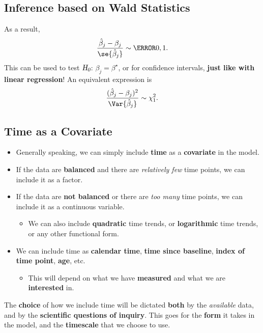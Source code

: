 \subsection*{Inference based on Wald Statistics}
As a result,
\[ \frac{\hat{\beta}_j-\beta_j}{\se{\hat{\beta}_j}}\sim \N{0,1}. \]
This can be used to test $ \textsl{H}_{\textsl{0}} $: $ \beta_j=\beta^\star $, or for confidence intervals,
\textbf{just like with linear regression}! An equivalent expression is
\[ \frac{(\hat{\beta}_j-\beta_j)^2}{\Var{\hat{\beta}_j}}\sim \chi^2_1. \]
\subsection*{Time as a Covariate}
\begin{itemize}
    \item Generally speaking, we can simply include \textbf{time} as a \textbf{covariate} in the model.
    \item If the data are \textbf{balanced} and there are \emph{relatively few} time points, we can include it
          as a factor.
    \item If the data are \textbf{not balanced} or there are \emph{too many} time points, we can include it
          as a continuous variable.
          \begin{itemize}
              \item We can also include \textbf{quadratic} time trends, or \textbf{logarithmic} time trends, or any other
                    functional form.
          \end{itemize}
    \item We can include time as \textbf{calendar time}, \textbf{time since baseline}, \textbf{index of time point}, \textbf{age}, etc.
          \begin{itemize}
              \item This will depend on what we have \textbf{measured} and what we are \textbf{interested} in.
          \end{itemize}
\end{itemize}
The \textbf{choice} of how we include time will be dictated \textbf{both} by the \emph{available} data,
and by the \textbf{scientific questions of inquiry}.
This goes for the \textbf{form} it takes in the model, and the \textbf{timescale} that we choose
to use.